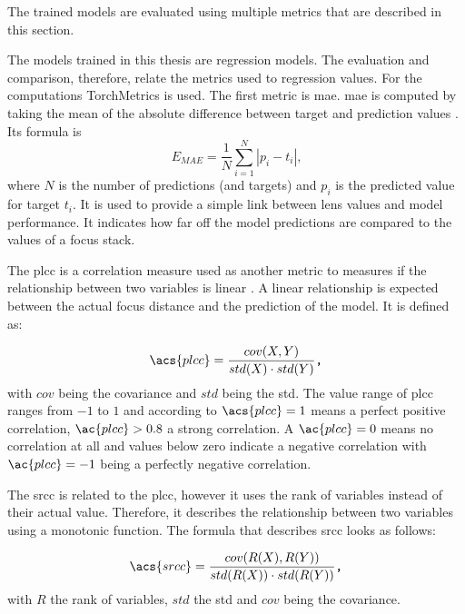 The trained models are evaluated using multiple metrics that are described in this section.

The models trained in this thesis are regression models. The evaluation and comparison, therefore, relate the metrics used to regression values. For the computations TorchMetrics \cite{2022pytorchmetrics} is used. The first metric is \ac{mae}. \Ac{mae} is computed by taking the mean of the absolute difference between target and prediction values \cite{sammut2010mean}. Its formula is \begin{equation} E_{MAE} = \frac{1}{N}\sum_{i=1}^N |p_i - t_i| \text{,} \end{equation} where $N$ is the number of predictions (and targets) and $p_i$ is the predicted value for target $t_i$.
It is used to provide a simple link between lens values and model performance. It indicates how far off the model predictions are compared to the values of a focus stack.

The \ac{plcc} \cite{pearson1909determination} is a correlation measure used as another metric to measures if the relationship between two variables is linear \cite{profillidis2019statistical}. A linear relationship is expected between the actual focus distance and the prediction of the model. It is defined as:

\begin{equation} \acs{plcc} = \frac{cov(X,Y)}{std(X) \cdot std(Y)} \texttt{,} \end{equation}
with $cov$ being the covariance and $std$ being the \acl{std}. The value range of \ac{plcc} ranges from $-1$ to $1$ and according to \textcite{profillidis2019statistical} $\acs{plcc} = 1$ means a perfect positive correlation, $\ac{plcc} > 0.8$ a strong correlation. A $\ac{plcc} = 0$ means no correlation at all and values below zero indicate a negative correlation with $\ac{plcc} = -1$ being a perfectly negative correlation.


The \ac{srcc} \cite{spearman1904proof} is related to the \ac{plcc}, however it uses the rank of variables instead of their actual value. Therefore, it describes the relationship between two variables using a monotonic function. The formula that describes \ac{srcc} looks as follows:

\begin{equation} \acs{srcc} = \frac{cov(R(X),R(Y))}{std(R(X)) \cdot std(R(Y))} \texttt{,} \end{equation} with $R$ the rank of variables, $std$ the \acl{std} and $cov$ being the covariance.

